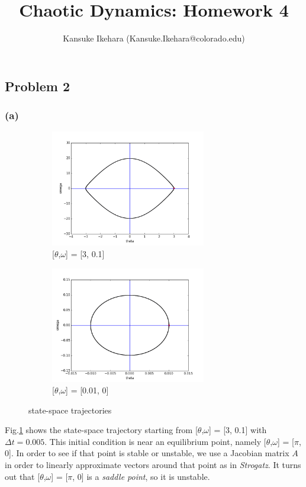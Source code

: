 \documentclass{article}
\title{Chaotic Dynamics: Homework 4}
\author{Kansuke Ikehara (Kansuke.Ikehara@colorado.edu)}
\begin{document}
\maketitle

\subsection*{Problem 2}
\subsubsection*{(a)}

\begin{figure}
\centering
\begin{subfigure}{.5\textwidth}
  \centering
  \includegraphics[height=2in]{figs/Q2_a.png}
  \caption{[$\theta$,$\omega$] = [3, 0.1]}
  \label{q2a}
\end{subfigure}%
\begin{subfigure}{.5\textwidth}
  \centering
  \includegraphics[height=2in]{figs/Q2_b.png}
  \caption{[$\theta$,$\omega$] = [0.01, 0]}
  \label{q2b}
\end{subfigure}
\caption{state-space trajectories}
\label{fig:test}
\end{figure}

Fig.\ref{q2a} shows the state-space trajectory starting from [$\theta$,$\omega$] = [3, 0.1] with $\Delta t = 0.005$. This initial condition is near an equilibrium point, namely [$\theta$,$\omega$] = [$\pi$, 0]. In order to see if that point is stable or unstable, we use a Jacobian matrix $A$ in order to linearly approximate vectors around that point as in \textit{Strogatz}. It turns out that  [$\theta$,$\omega$] = [$\pi$, 0] is a \textit{saddle point}, so it is unstable.
\end{document}
